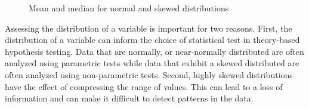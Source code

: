 \documentclass[
  letterpaper,
  krantz1]{latex/krantz-mod}
\theoremstyle{definition}
\theoremstyle{definition}
\theoremstyle{remark}
\begin{document}
\begin{figure}[!htb]
\begin{minipage}{0.33\linewidth}
{}


\end{minipage}%
%
\begin{minipage}{0.33\linewidth}



\end{minipage}%

\caption{\label{fig-analysis-distributions}Mean and median for normal
and skewed distributions}

\end{figure}%

Assessing the distribution of a variable is important for two reasons.
First, the distribution of a variable can inform the
choice of statistical test in theory-based hypothesis
testing. Data that are normally, or
near-normally distributed are often analyzed using parametric
tests while data that exhibit a skewed
distributed are often analyzed using non-parametric
tests. Second, highly skewed
distributions have the effect of compressing the range of values. This
can lead to a loss of information and can make it difficult to detect
patterns in the data.
\end{document}
